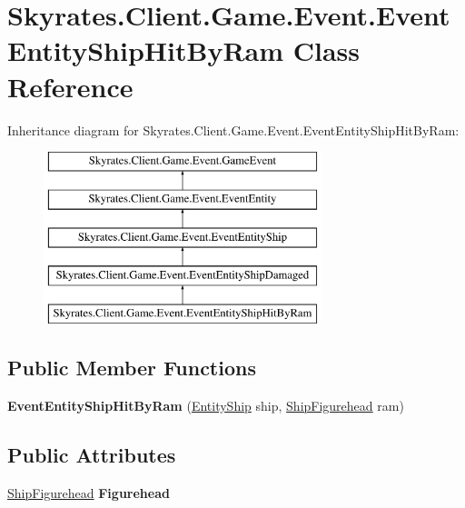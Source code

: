 \hypertarget{class_skyrates_1_1_client_1_1_game_1_1_event_1_1_event_entity_ship_hit_by_ram}{\section{Skyrates.\-Client.\-Game.\-Event.\-Event\-Entity\-Ship\-Hit\-By\-Ram Class Reference}
\label{class_skyrates_1_1_client_1_1_game_1_1_event_1_1_event_entity_ship_hit_by_ram}
}
Inheritance diagram for Skyrates.\-Client.\-Game.\-Event.\-Event\-Entity\-Ship\-Hit\-By\-Ram\-:\begin{figure}[H]
\begin{center}
\leavevmode
\includegraphics[height=5.000000cm]{class_skyrates_1_1_client_1_1_game_1_1_event_1_1_event_entity_ship_hit_by_ram}
\end{center}
\end{figure}
\subsection*{Public Member Functions}
\begin{DoxyCompactItemize}
\item 
\hypertarget{class_skyrates_1_1_client_1_1_game_1_1_event_1_1_event_entity_ship_hit_by_ram_ad94fc2f7f3edfe005e00b18b7f8ade24}{{\bfseries Event\-Entity\-Ship\-Hit\-By\-Ram} (\hyperlink{class_skyrates_1_1_client_1_1_entity_1_1_entity_ship}{Entity\-Ship} ship, \hyperlink{class_skyrates_1_1_client_1_1_ship_1_1_ship_figurehead}{Ship\-Figurehead} ram)}\label{class_skyrates_1_1_client_1_1_game_1_1_event_1_1_event_entity_ship_hit_by_ram_ad94fc2f7f3edfe005e00b18b7f8ade24}

\end{DoxyCompactItemize}
\subsection*{Public Attributes}
\begin{DoxyCompactItemize}
\item 
\hypertarget{class_skyrates_1_1_client_1_1_game_1_1_event_1_1_event_entity_ship_hit_by_ram_a139003403af668e386ef09085511a81c}{\hyperlink{class_skyrates_1_1_client_1_1_ship_1_1_ship_figurehead}{Ship\-Figurehead} {\bfseries Figurehead}}\label{class_skyrates_1_1_client_1_1_game_1_1_event_1_1_event_entity_ship_hit_by_ram_a139003403af668e386ef09085511a81c}

\end{DoxyCompactItemize}
